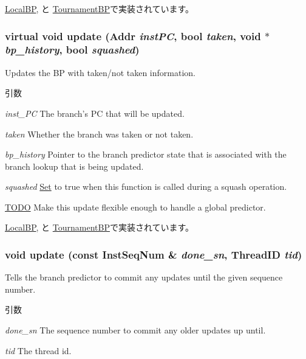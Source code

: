 \hyperlink{classLocalBP_ad3d898a5eab93d923a1073fe6a0f0030}{LocalBP}, と \hyperlink{classTournamentBP_ad3d898a5eab93d923a1073fe6a0f0030}{TournamentBP}で実装されています。\hypertarget{classBPredUnit_ab00dd76dc9f830cdae0edc72357c013a}{
\subsubsection[{update}]{\setlength{\rightskip}{0pt plus 5cm}virtual void update ({\bf Addr} {\em instPC}, \/  bool {\em taken}, \/  void $\ast$ {\em bp\_\-history}, \/  bool {\em squashed})}}
\label{classBPredUnit_ab00dd76dc9f830cdae0edc72357c013a}
Updates the BP with taken/not taken information. 
\begin{DoxyParams}{引数}
\item[{\em inst\_\-PC}]The branch's PC that will be updated. \item[{\em taken}]Whether the branch was taken or not taken. \item[{\em bp\_\-history}]Pointer to the branch predictor state that is associated with the branch lookup that is being updated. \item[{\em squashed}]\hyperlink{classSet}{Set} to true when this function is called during a squash operation. \end{DoxyParams}
\begin{Desc}
\item[\hyperlink{todo__todo000048}{TODO}]Make this update flexible enough to handle a global predictor. \end{Desc}


\hyperlink{classLocalBP_a590e0fd17d5b663e25f0e956fadc7062}{LocalBP}, と \hyperlink{classTournamentBP_a590e0fd17d5b663e25f0e956fadc7062}{TournamentBP}で実装されています。\hypertarget{classBPredUnit_a6e4be480aeb0d4acfb352802ab73a3df}{
\subsubsection[{update}]{\setlength{\rightskip}{0pt plus 5cm}void update (const {\bf InstSeqNum} \& {\em done\_\-sn}, \/  {\bf ThreadID} {\em tid})}}
\label{classBPredUnit_a6e4be480aeb0d4acfb352802ab73a3df}
Tells the branch predictor to commit any updates until the given sequence number. 
\begin{DoxyParams}{引数}
\item[{\em done\_\-sn}]The sequence number to commit any older updates up until. \item[{\em tid}]The thread id. \end{DoxyParams}



